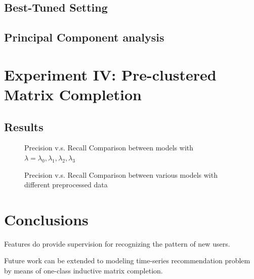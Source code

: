 \documentclass{article} %
\begin{document}
\subsection{Best-Tuned Setting}

\subsection{Principal Component analysis}


\section{Experiment IV: Pre-clustered Matrix Completion}

\subsection{Results}



\begin{figure}[h]

    \caption{Precision v.s. Recall Comparison between models with
        $\lambda=\lambda_0, \lambda_1,\lambda_2, \lambda_3$ }
\end{figure}

\begin{figure}[h]

    \caption{Precision v.s. Recall Comparison between various models with
        different preprocessed data}
\end{figure}

\section{Conclusions}
Features do provide supervision for recognizing the pattern of new users. 

Future work can be extended to modeling time-series recommendation problem by
means of one-class inductive matrix completion. 

{}

\end{document}
